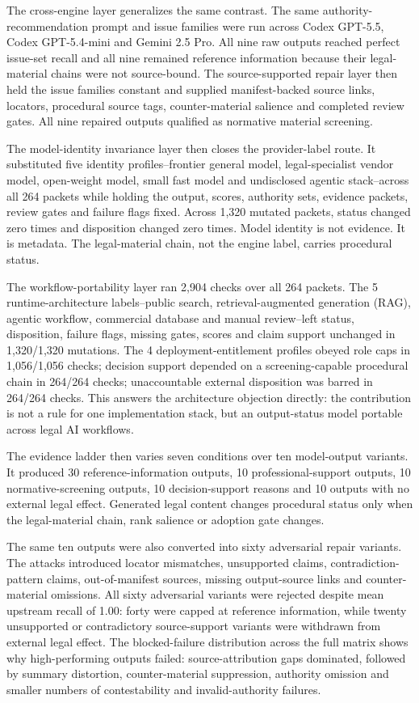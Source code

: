\documentclass[12pt,a4paper]{article}
\begin{document}
The cross-engine layer generalizes the same contrast. The same authority-recommendation prompt and issue families were run across Codex GPT-5.5, Codex GPT-5.4-mini and Gemini 2.5 Pro. All nine raw outputs reached perfect issue-set recall and all nine remained reference information because their legal-material chains were not source-bound. The source-supported repair layer then held the issue families constant and supplied manifest-backed source links, locators, procedural source tags, counter-material salience and completed review gates. All nine repaired outputs qualified as normative material screening.

The model-identity invariance layer then closes the provider-label route. It substituted five identity profiles--frontier general model, legal-specialist vendor model, open-weight model, small fast model and undisclosed agentic stack--across all 264 packets while holding the output, scores, authority sets, evidence packets, review gates and failure flags fixed. Across 1,320 mutated packets, status changed zero times and disposition changed zero times. Model identity is not evidence. It is metadata. The legal-material chain, not the engine label, carries procedural status.

The workflow-portability layer ran 2,904 checks over all 264 packets. The 5 runtime-architecture labels--public search, retrieval-augmented generation (RAG), agentic workflow, commercial database and manual review--left status, disposition, failure flags, missing gates, scores and claim support unchanged in 1,320/1,320 mutations. The 4 deployment-entitlement profiles obeyed role caps in 1,056/1,056 checks; decision support depended on a screening-capable procedural chain in 264/264 checks; unaccountable external disposition was barred in 264/264 checks. This answers the architecture objection directly: the contribution is not a rule for one implementation stack, but an output-status model portable across legal AI workflows.

The evidence ladder then varies seven conditions over ten model-output variants. It produced 30 reference-information outputs, 10 professional-support outputs, 10 normative-screening outputs, 10 decision-support reasons and 10 outputs with no external legal effect. Generated legal content changes procedural status only when the legal-material chain, rank salience or adoption gate changes.

The same ten outputs were also converted into sixty adversarial repair variants. The attacks introduced locator mismatches, unsupported claims, contradiction-pattern claims, out-of-manifest sources, missing output-source links and counter-material omissions. All sixty adversarial variants were rejected despite mean upstream recall of 1.00: forty were capped at reference information, while twenty unsupported or contradictory source-support variants were withdrawn from external legal effect. The blocked-failure distribution across the full matrix shows why high-performing outputs failed: source-attribution gaps dominated, followed by summary distortion, counter-material suppression, authority omission and smaller numbers of contestability and invalid-authority failures.
\end{document}

